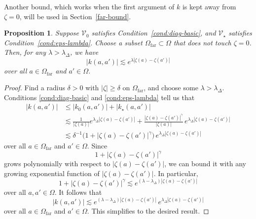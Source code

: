 \documentclass{article}
\theoremstyle{definition}
\theoremstyle{plain}
\newtheorem{proposition}{Proposition}
\newcommand{\hardpart}{\mathcal{V}_0}
\newcommand{\softpart}{\mathcal{V}_\star}
\newcommand{\kerwhole}{k}
\newcommand{\hardker}{k_0}
\newcommand{\softker}{k_\star}
\newcommand{\domain}{\Omega}
\newcommand{\far}{\Omega_\text{far}}
\begin{document}
Another bound, which works when the first argument of $\kerwhole$ is kept away from $\zeta = 0$, will be used in Section~\ref{far-bound}.
\begin{proposition}\label{prop:whole-ker-far-bound}
Suppose $\hardpart$ satisfies {\em Condition~\eqref{cond:diag-basic}}, and $\softpart$ satisfies {\em Condition~\eqref{cond:eps-lambda}}. Choose a subset $\far \subset \domain$ that does not touch $\zeta = 0$. Then, for any $\lambda > \lambda_\Delta$, we have
\[ |\kerwhole(a,a')| \lesssim e^{\lambda |\zeta(a)-\zeta(a')|} \]
over all $a \in \far$ and $a' \in \domain$.
\end{proposition}
\begin{proof}
Find a radius $\delta > 0$ with $|\zeta| \ge \delta$ on $\far$, and choose some $\lambda > \lambda_\Delta$. Conditions \eqref{cond:diag-basic} and \eqref{cond:eps-lambda} tell us that
\begin{align*}
|\kerwhole(a,a')|&\leq |\hardker(a,a')| + |\softker(a,a')|\\
&\lesssim \frac{1}{|\zeta(a)|} e^{\lambda_\Delta |\zeta(a)-\zeta(a')|} + \frac{|\zeta(a)-\zeta(a')|^\gamma}{|\zeta(a)|}\,e^{\lambda_\Delta|\zeta(a)-\zeta(a')|}\\
&\lesssim \delta^{-1} \big(1 + |\zeta(a)-\zeta(a')|^\gamma \big) \, e^{\lambda_\Delta|\zeta(a)-\zeta(a')|}
\end{align*}
over all $a \in \far$ and $a' \in \domain$. Since
\[ 1 + |\zeta(a)-\zeta(a')|^\gamma \]
grows polynomially with respect to $|\zeta(a)-\zeta(a')|$, we can bound it with any growing exponential function of $|\zeta(a)-\zeta(a')|$. In particular,
\[ 1 + |\zeta(a)-\zeta(a')|^\gamma \lesssim e^{(\lambda - \lambda_\Delta) |\zeta(a)-\zeta(a')|} \]
over all $a, a' \in \domain$. It follows that
\[ |\kerwhole(a,a')| \lesssim e^{(\lambda - \lambda_\Delta) |\zeta(a)-\zeta(a')|} \, e^{\lambda_\Delta|\zeta(a)-\zeta(a')|} \]
over all $a \in \far$ and $a' \in \domain$. This simplifies to the desired result.
\end{proof}
\end{document}
